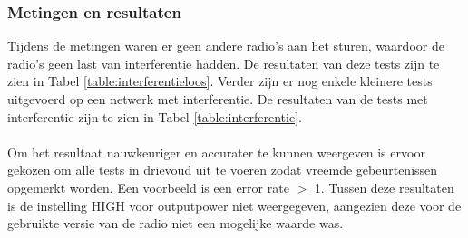 \documentclass{article}
\begin{document}
\subsubsection{Metingen en resultaten}
Tijdens de metingen waren er geen andere radio's aan het sturen, waardoor de radio's geen last van interferentie hadden. De resultaten van deze tests zijn te zien in Tabel \ref{table:interferentieloos}. Verder zijn er nog enkele kleinere tests uitgevoerd op een netwerk met interferentie. De resultaten van de tests met interferentie zijn te zien in Tabel \ref{table:interferentie}. \\
\\
Om het resultaat nauwkeuriger en accurater te kunnen weergeven is ervoor gekozen om alle tests in drievoud uit te voeren zodat vreemde gebeurtenissen opgemerkt worden. Een voorbeeld is een error rate $>$ 1. Tussen deze resultaten is de instelling HIGH voor outputpower niet weergegeven, aangezien deze voor de gebruikte versie van de radio niet een mogelijke waarde was.
\end{document}

